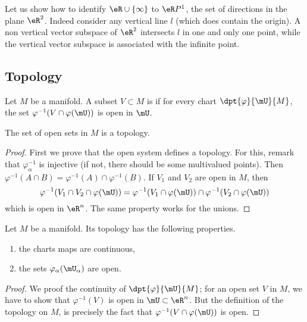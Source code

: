 Let us show how to identify $\eR\cup\{ \infty \}$ to $\eR P^1$, the set of directions in the plane $\eR^2$. Indeed consider any vertical line $l$ (which does contain the origin). A non vertical vector subspace of $\eR^2$ intersects $l$ in one and only one point, while the vertical vector subspace is associated with the infinite point.

\subsection{Topology}

\begin{propositionDef}
    Let \( M\) be a manifold. A subset $V\subset M$ is  if for every chart $\dpt{\varphi}{\mU}{M}$, the set $\varphi^{-1}(V\cap\varphi(\mU))$ is open in $\mU$. 

    The set of open sets in \( M\) is a topology.
\end{propositionDef}

\begin{proof}
    First we prove that the open system defines a topology. For this, remark that $\varphi_{\alpha}^{-1}$ is injective (if not, there should be some multivalued points). Then $\varphi^{-1}(A\cap B)=\varphi^{-1}(A)\cap\varphi^{-1}(B)$. If $V_1$ and $V_2$ are open in $M$, then
    \begin{equation}
        \varphi^{-1}(V_1\cap V_2\cap\varphi(\mU))=\varphi^{-1}(V_1\cap\varphi(\mU))\cap\varphi^{-1}(V_2\cap\varphi(\mU))
    \end{equation}
    which is open in $\eR^n$. The same property works for the unions.
\end{proof}

\begin{theorem}
    Let \( M\) be a manifold. Its topology has the following properties.
    \begin{enumerate}
        \item the charts maps are continuous,
        \item the sets $\varphi_{\alpha}(\mU_{\alpha})$ are open.
    \end{enumerate}
\end{theorem}

\begin{proof}
    We proof the continuity of $\dpt{\varphi}{\mU}{M}$; for an open set $V$ in $M$, we have to show that $\varphi^{-1}(V)$ is open in $\mU\subset\eR^n$. But the definition of the topology on $M$, is precisely the fact that $\varphi^{-1}(V\cap\varphi(\mU))$ is open.
\end{proof}

